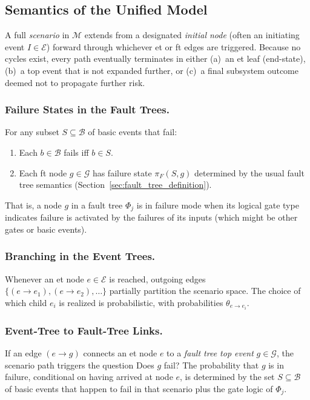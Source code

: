 \subsection{Semantics of the Unified Model}

A full \emph{scenario} in \(\mathcal{M}\) extends from a designated \textit{initial node} (often an initiating event \(I\in \mathcal{E}\)) forward through whichever \acrshort{et} or \acrshort{ft} edges are triggered.  Because no cycles exist, every path eventually terminates in either (a)~an \acrshort{et} leaf (end-state), (b)~a top event that is not expanded further, or (c)~a final subsystem outcome deemed not to propagate further risk.

\subsubsection{Failure States in the Fault Trees.}
For any subset \(S\subseteq \mathcal{B}\) of basic events that fail:
\begin{enumerate}
\item Each \(b\in \mathcal{B}\) fails iff \(b\in S\).  
\item Each \acrshort{ft} node \(g\in \mathcal{G}\) has failure state \(\pi_{F}(S,g)\) determined by the usual fault tree semantics (Section~\ref{sec:fault_tree_definition}).  
\end{enumerate}
That is, a node \(g\) in a fault tree \(\Phi_j\) is in failure mode when its logical gate type indicates failure is activated by the failures of its inputs (which might be other gates or basic events).

\subsubsection{Branching in the Event Trees.}
Whenever an \acrshort{et} node \(e\in \mathcal{E}\) is reached, outgoing edges \(\{(e \to e_1), (e\to e_2),\dots\}\) partially partition the scenario space.  The choice of which child \(e_i\) is realized is probabilistic, with probabilities \(\theta_{e\to e_i}.\)

\subsubsection{Event-Tree to Fault-Tree Links.}
If an edge \((e\to g)\) connects an \acrshort{et} node \(e\) to a \emph{fault tree top event} \(g\in \mathcal{G}\), the scenario path triggers the question Does \(g\) fail?  The probability that \(g\) is in failure, conditional on having arrived at node \(e\), is determined by the set \(S\subseteq \mathcal{B}\) of basic events that happen to fail in that scenario plus the gate logic of \(\Phi_j\).

